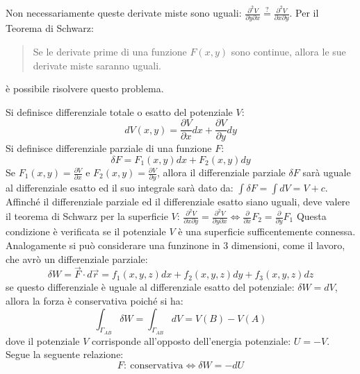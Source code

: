 \documentclass{article}
\numberwithin{equation}{subsection}
\begin{document}
Non necessariamente queste derivate miste sono uguali: 
$\displaystyle\frac{\partial^{2} V}{\partial y\partial x}\stackrel{?}{=}\displaystyle\frac{\partial^{2} V}{\partial x\partial y}$.
Per il Teorema di Schwarz:
\begin{quotation}
    Se le derivate prime di una funzione $F(x,y)$ sono continue, 
    allora le sue derivate miste saranno uguali.
\end{quotation}
è possibile risolvere questo problema. 



Si definisce differenziale totale o esatto del potenziale $V$:
\begin{equation*}
    dV(x,y)=\displaystyle\frac{\partial V}{\partial x}dx+\frac{\partial V}{\partial y}dy
\end{equation*}
Si definisce differenziale parziale di una funzione $F$:
\begin{equation*}
    \delta F=F_1(x,y)dx+F_2(x,y)dy
\end{equation*}
Se $F_1(x,y) = \displaystyle\frac{\partial V}{\partial x}$ e 
$F_2(x,y) = \displaystyle\frac{\partial V}{\partial y}$, 
allora il differenziale parziale $\delta F$ sarà uguale al 
differenziale esatto ed il suo integrale sarà dato da:
$\displaystyle\int\delta F=\int dV=V+c$.
Affinché il differenziale parziale ed il differenziale esatto 
siano uguali, deve valere il teorema di Schwarz per la superficie 
$V$:
$\displaystyle\frac{\partial ^{2}V}{\partial x\partial y}=\frac{\partial ^{2}V}{\partial y\partial x}\iff \frac{\partial}{\partial x}F_2=\frac{\partial}{\partial y}F_1$
Questa condizione è verificata se il potenziale $V$ è una 
superficie sufficentemente connessa. 
Analogamente si può considerare una funzinone in $3$ dimensioni, 
come il lavoro, che avrò un differenziale parziale: 
\begin{equation*}
    \delta W=\vec{F}\cdot d\vec{r}=f_1(x,y,z)dx+f_2(x,y,z)dy+f_3(x,y,z)dz
\end{equation*}
se questo differenziale è uguale al differenziale 
esatto del potenziale: $\delta W =dV$, allora la forza 
è conservativa poiché si ha: 
\begin{equation}
    \int_{\Gamma_{AB}}\delta W = \int_{\Gamma_{AB}}dV=V(B)-V(A)
\end{equation}
dove il potenziale $V$ corrisponde all'opposto dell'energia 
potenziale: $U=-V$.
Segue la seguente relazione:
\begin{equation}
    F:\:\mbox{conservativa}\iff\delta W=-dU
\end{equation}
\end{document}
